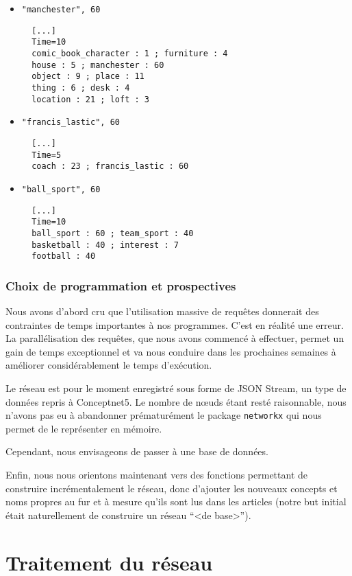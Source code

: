 \documentclass[a4paper, 12pt]{article}
\newcommand{\pyt}[1]{\texttt{#1}}%
\begin{document}
\begin{itemize}
 \item \verb|"manchester", 60|
 \begin{verbatim}
  [...]
  Time=10
  comic_book_character : 1 ; furniture : 4
  house : 5 ; manchester : 60
  object : 9 ; place : 11
  thing : 6 ; desk : 4
  location : 21 ; loft : 3
 \end{verbatim}
\item \verb|"francis_lastic", 60|
\begin{verbatim}
  [...]
  Time=5
  coach : 23 ; francis_lastic : 60
\end{verbatim}
\item \verb|"ball_sport", 60|
\begin{verbatim}
  [...]
  Time=10
  ball_sport : 60 ; team_sport : 40
  basketball : 40 ; interest : 7
  football : 40
\end{verbatim}
\end{itemize}

\subsubsection{Choix de programmation et prospectives}

Nous avons d'abord cru que l'utilisation massive de requêtes donnerait des contraintes de temps importantes à nos programmes. C'est en réalité une erreur. La parallélisation des requêtes, que nous avons commencé à effectuer, permet un gain de temps exceptionnel et va nous conduire dans les prochaines semaines à améliorer considérablement le temps d'exécution.

Le réseau est pour le moment enregistré sous forme de JSON Stream, un type de données repris à Conceptnet5. Le nombre de nœuds étant resté raisonnable, nous n'avons pas eu à abandonner prématurément le package \pyt{networkx} qui nous permet de le représenter en mémoire.

Cependant, nous envisageons de passer à une base de données.

Enfin, nous nous orientons maintenant vers des fonctions permettant de construire incrémentalement le réseau, donc d'ajouter les nouveaux concepts et noms propres au fur et à mesure qu'ils sont lus dans les articles (notre but initial était naturellement de construire un réseau ``<de base>'').

\section{Traitement du réseau}
\end{document}
